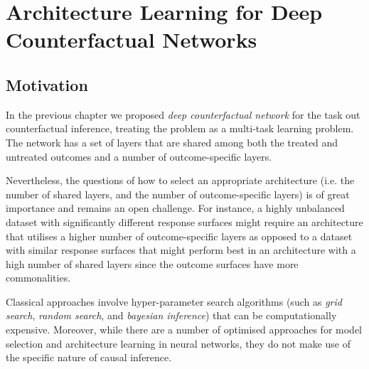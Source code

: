 %

\chapter{\label{ch:4-DCN-LAs}Architecture Learning for Deep Counterfactual Networks} 


\section{Motivation}

In the previous chapter we proposed \emph{deep counterfactual network} for the task out counterfactual inference, treating the problem as a multi-task learning problem. The network has a set of layers that are shared among both the treated and untreated outcomes and a number of outcome-specific layers. 

Nevertheless, the questions of how to select an appropriate architecture (i.e. the number of shared layers, and the number of outcome-specific layers) is of great importance and remains an open challenge. For instance, a highly unbalanced dataset with significantly different response surfaces might require an architecture that utilises a higher number of outcome-specific layers as opposed to a dataset with similar response surfaces that might perform best in an architecture with a high number of shared layers since the outcome surfaces have more commonalities. 

Classical approaches involve hyper-parameter search algorithms (such as \emph{grid search}, \emph{random search}, and \emph{bayesian inference}) that can be computationally expensive. Moreover, while there are a number of optimised approaches for model selection and architecture learning in neural networks, they do not make use of the specific nature of causal inference.

